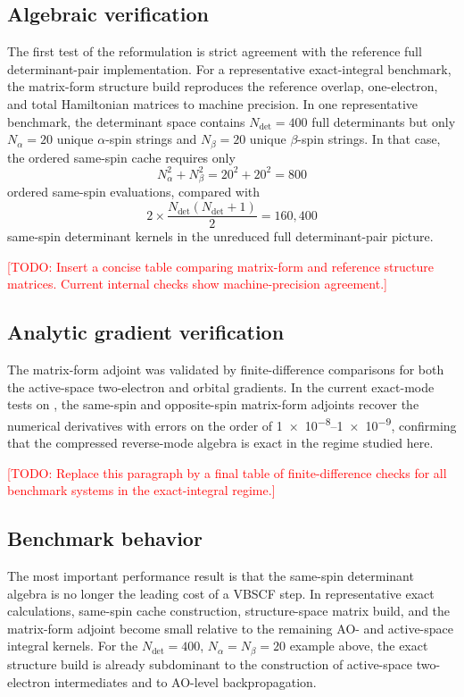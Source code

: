 \documentclass[journal=jctcce,manuscript=article]{achemso}
\newcommand{\na}{N_{\alpha}}
\newcommand{\nb}{N_{\beta}}
\newcommand{\ndet}{N_{\mathrm{det}}}
\newcommand{\todo}[1]{\textcolor{red}{[TODO: #1]}}
\begin{document}
\subsection{Algebraic verification}
The first test of the reformulation is strict agreement with the reference full
determinant-pair implementation. For a representative exact-integral benchmark,
the matrix-form structure build reproduces the reference overlap, one-electron,
and total Hamiltonian matrices to machine precision. In one representative
benchmark, the determinant space contains $\ndet = 400$ full determinants but
only $\na = 20$ unique
$\alpha$-spin strings and $\nb = 20$ unique $\beta$-spin strings. In that
case, the ordered same-spin cache requires only
\begin{equation}
\na^2 + \nb^2 = 20^2 + 20^2 = 800
\end{equation}
ordered same-spin evaluations, compared with
\begin{equation}
2 \times \frac{\ndet(\ndet+1)}{2} = 160{,}400
\end{equation}
same-spin determinant kernels in the unreduced full determinant-pair picture.

\todo{Insert a concise table comparing matrix-form and reference structure
matrices. Current internal checks show machine-precision agreement.}

\subsection{Analytic gradient verification}
The matrix-form adjoint was validated by finite-difference comparisons for both
the active-space two-electron and orbital gradients. In the current exact-mode
tests on , the same-spin and opposite-spin matrix-form adjoints recover
the numerical derivatives with errors on the order of
\num{1e-8}--\num{1e-9}, confirming that the compressed reverse-mode algebra is
exact in the regime studied here.

\todo{Replace this paragraph by a final table of finite-difference checks for
all benchmark systems in the exact-integral regime.}

\subsection{Benchmark behavior}
The most important performance result is that the same-spin determinant algebra
is no longer the leading cost of a VBSCF step. In representative exact
calculations, same-spin cache construction, structure-space matrix build, and
the matrix-form adjoint become small relative to the remaining AO- and
active-space integral kernels. For the $\ndet=400$, $\na=\nb=20$ example
above, the exact structure build is already subdominant to the
construction of active-space two-electron intermediates and to AO-level
backpropagation.
\end{document}
